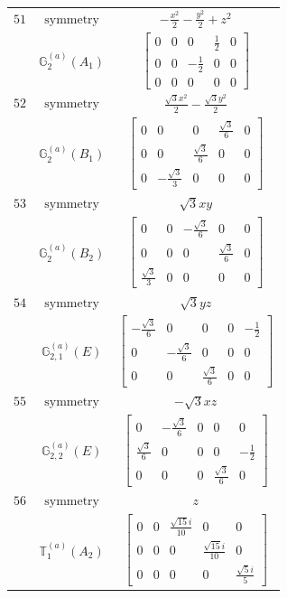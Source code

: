 \documentclass[fleqn,8pt,landscape]{jsarticle}
\begin{document}
\begin{longtable}{ccc}
$ 51 $ & $ \text{symmetry} $ & $ - \frac{x^{2}}{2} - \frac{y^{2}}{2} + z^{2} $ \\
$  $ & $ \mathbb{G}_{2}^{(a)}(A_{1}) $ & $ \begin{bmatrix} 0 & 0 & 0 & \frac{1}{2} & 0 \\ 0 & 0 & - \frac{1}{2} & 0 & 0 \\ 0 & 0 & 0 & 0 & 0 \end{bmatrix} $ \\ \hline
$ 52 $ & $ \text{symmetry} $ & $ \frac{\sqrt{3} x^{2}}{2} - \frac{\sqrt{3} y^{2}}{2} $ \\
$  $ & $ \mathbb{G}_{2}^{(a)}(B_{1}) $ & $ \begin{bmatrix} 0 & 0 & 0 & \frac{\sqrt{3}}{6} & 0 \\ 0 & 0 & \frac{\sqrt{3}}{6} & 0 & 0 \\ 0 & - \frac{\sqrt{3}}{3} & 0 & 0 & 0 \end{bmatrix} $ \\ \hline
$ 53 $ & $ \text{symmetry} $ & $ \sqrt{3} x y $ \\
$  $ & $ \mathbb{G}_{2}^{(a)}(B_{2}) $ & $ \begin{bmatrix} 0 & 0 & - \frac{\sqrt{3}}{6} & 0 & 0 \\ 0 & 0 & 0 & \frac{\sqrt{3}}{6} & 0 \\ \frac{\sqrt{3}}{3} & 0 & 0 & 0 & 0 \end{bmatrix} $ \\ \hline
$ 54 $ & $ \text{symmetry} $ & $ \sqrt{3} y z $ \\
$  $ & $ \mathbb{G}_{2,1}^{(a)}(E) $ & $ \begin{bmatrix} - \frac{\sqrt{3}}{6} & 0 & 0 & 0 & - \frac{1}{2} \\ 0 & - \frac{\sqrt{3}}{6} & 0 & 0 & 0 \\ 0 & 0 & \frac{\sqrt{3}}{6} & 0 & 0 \end{bmatrix} $ \\ \hline
$ 55 $ & $ \text{symmetry} $ & $ - \sqrt{3} x z $ \\
$  $ & $ \mathbb{G}_{2,2}^{(a)}(E) $ & $ \begin{bmatrix} 0 & - \frac{\sqrt{3}}{6} & 0 & 0 & 0 \\ \frac{\sqrt{3}}{6} & 0 & 0 & 0 & - \frac{1}{2} \\ 0 & 0 & 0 & \frac{\sqrt{3}}{6} & 0 \end{bmatrix} $ \\ \hline
$ 56 $ & $ \text{symmetry} $ & $ z $ \\
$  $ & $ \mathbb{T}_{1}^{(a)}(A_{2}) $ & $ \begin{bmatrix} 0 & 0 & \frac{\sqrt{15} i}{10} & 0 & 0 \\ 0 & 0 & 0 & \frac{\sqrt{15} i}{10} & 0 \\ 0 & 0 & 0 & 0 & \frac{\sqrt{5} i}{5} \end{bmatrix} $ \\ \hline

\end{longtable}
\end{document}
